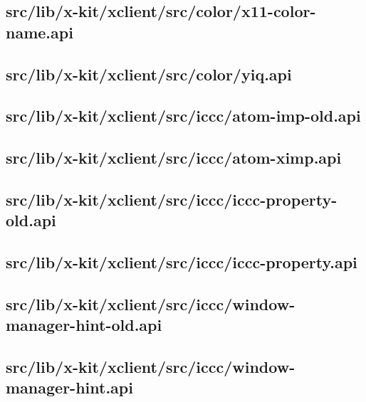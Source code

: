 \subsection{src/lib/x-kit/xclient/src/color/x11-color-name.api}


\subsection{src/lib/x-kit/xclient/src/color/yiq.api}


\subsection{src/lib/x-kit/xclient/src/iccc/atom-imp-old.api}


\subsection{src/lib/x-kit/xclient/src/iccc/atom-ximp.api}


\subsection{src/lib/x-kit/xclient/src/iccc/iccc-property-old.api}


\subsection{src/lib/x-kit/xclient/src/iccc/iccc-property.api}


\subsection{src/lib/x-kit/xclient/src/iccc/window-manager-hint-old.api}


\subsection{src/lib/x-kit/xclient/src/iccc/window-manager-hint.api}


